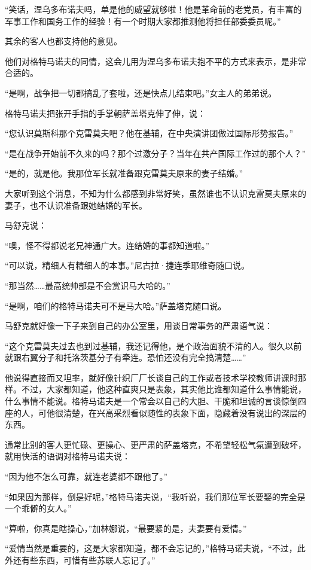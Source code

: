 “笑话，涅乌多布诺夫吗，单是他的威望就够啦！他是革命前的老党员，有丰富的军事工作和国务工作的经验！有一个时期大家都推测他将担任部委委员呢。”

其余的客人也都支持他的意见。

他们对格特马诺夫的同情，这会儿用为涅乌多布诺夫抱不平的方式来表示，是非常合适的。

“是啊，战争把一切都搞乱了套啦，还是快点儿结束吧。”女主人的弟弟说。

格特马诺夫把张开手指的手掌朝萨盖塔克伸了伸，说：

“您认识莫斯科那个克雷莫夫吧？他在基辅，在中央演讲团做过国际形势报告。”

“是在战争开始前不久来的吗？那个过激分子？当年在共产国际工作过的那个人？”

“是的，就是他。我那位军长就准备跟克雷莫夫原来的妻子结婚。”

大家听到这个消息，不知为什么都感到非常好笑，虽然谁也不认识克雷莫夫原来的妻子，也不认识准备跟她结婚的军长。

马舒克说：

“噢，怪不得都说老兄神通广大。连结婚的事都知道啦。”

“可以说，精细人有精细人的本事。”尼古拉·捷连季耶维奇随口说。

“那当然……最高统帅部是不会赏识马大哈的。”

“是啊，咱们的格特马诺夫可不是马大哈。”萨盖塔克随口说。

马舒克就好像一下子来到自己的办公室里，用谈日常事务的严肃语气说：

“这个克雷莫夫过去也到过基辅，我还记得他，是个政治面貌不清的人。很久以前就跟右翼分子和托洛茨基分子有牵连。恐怕还没有完全搞清楚……”

他说得直接而又坦率，就好像针织厂厂长谈自己的工作或者技术学校教师讲课时那样。不过，大家都知道，他这种直爽只是表象，其实他比谁都知道什么事情能说，什么事情不能说。格特马诺夫是一个常会以自己的大胆、干脆和坦诚的言谈惊倒四座的人，可他很清楚，在兴高采烈看似随性的表象下面，隐藏着没有说出的深层的东西。

通常比别的客人更忙碌、更操心、更严肃的萨盖塔克，不希望轻松气氛遭到破坏，就用快活的语调对格特马诺夫说：

“因为他不怎么可靠，就连老婆都不跟他了。”

“如果因为那样，倒是好呢，”格特马诺夫说，“我听说，我们那位军长要娶的完全是一个乖僻的女人。”

“算啦，你真是瞎操心，”加林娜说，“最要紧的是，夫妻要有爱情。”

“爱情当然是重要的，这是大家都知道，都不会忘记的，”格特马诺夫说，“不过，此外还有些东西，可惜有些苏联人忘记了。”

